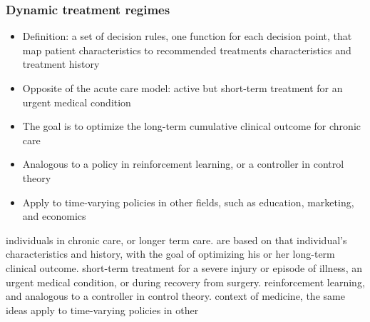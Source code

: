 \documentclass[unknownkeysallowed]{beamer}
\begin{document}
\begin{frame}
 \frametitle{Dynamic treatment regimes}
	\begin{itemize}
	\item Definition: a set of decision rules, one function for each decision
point, that map patient characteristics to recommended treatments
characteristics and treatment history
	\item Opposite of the acute care model:  active but short-term treatment for
an urgent medical condition
	\item The goal is to optimize the long-term cumulative clinical outcome for
chronic care
	\item Analogous to a policy in reinforcement learning, or a controller in
control theory
	\item Apply to time-varying policies in other fields, such as education,
marketing, and economics
	\end{itemize}
\end{frame}
individuals in chronic care, or longer term care.
are based on that individual's characteristics and history, with the goal of
optimizing his or her long-term clinical outcome.
short-term treatment for a severe injury or episode of illness, an urgent
medical condition, or during recovery from surgery.
reinforcement learning, and analogous to a controller in control theory. 
context of medicine, the same ideas apply to time-varying policies in other
\end{document}
